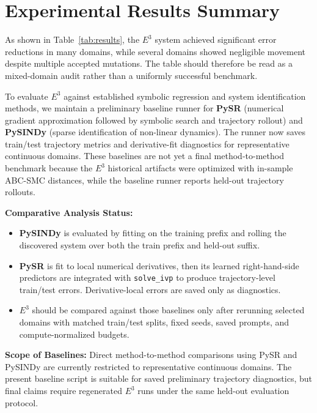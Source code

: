 \section{Experimental Results Summary}
\label{sec:results}



As shown in Table~\ref{tab:results}, the $E^3$ system achieved significant error reductions in many domains, while several domains showed negligible movement despite multiple accepted mutations. The table should therefore be read as a mixed-domain audit rather than a uniformly successful benchmark.

To evaluate $E^3$ against established symbolic regression and system identification methods, we maintain a preliminary baseline runner for \textbf{PySR} (numerical gradient approximation followed by symbolic search and trajectory rollout) and \textbf{PySINDy} (sparse identification of non-linear dynamics). The runner now saves train/test trajectory metrics and derivative-fit diagnostics for representative continuous domains. These baselines are not yet a final method-to-method benchmark because the $E^3$ historical artifacts were optimized with in-sample ABC-SMC distances, while the baseline runner reports held-out trajectory rollouts.

\textbf{Comparative Analysis Status:} 
\begin{itemize}
    \item \textbf{PySINDy} is evaluated by fitting on the training prefix and rolling the discovered system over both the train prefix and held-out suffix.
    \item \textbf{PySR} is fit to local numerical derivatives, then its learned right-hand-side predictors are integrated with \texttt{solve\_ivp} to produce trajectory-level train/test errors. Derivative-local errors are saved only as diagnostics.
    \item \textbf{$E^3$} should be compared against those baselines only after rerunning selected domains with matched train/test splits, fixed seeds, saved prompts, and compute-normalized budgets.
\end{itemize}

\textbf{Scope of Baselines:} Direct method-to-method comparisons using PySR and PySINDy are currently restricted to representative continuous domains. The present baseline script is suitable for saved preliminary trajectory diagnostics, but final claims require regenerated $E^3$ runs under the same held-out evaluation protocol.


